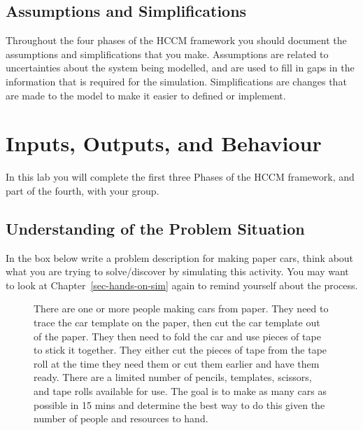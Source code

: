 \documentclass[
  10pt,
  a4paperpaper,
  DIV=11,
  numbers=noendperiod,
  oneside]{scrreprt}
\begin{document}
\section{Assumptions and
Simplifications}\label{assumptions-and-simplifications}

Throughout the four phases of the HCCM framework you should document the
assumptions and simplifications that you make. Assumptions are related
to uncertainties about the system being modelled, and are used to fill
in gaps in the information that is required for the simulation.
Simplifications are changes that are made to the model to make it easier
to defined or implement.

\chapter{Inputs, Outputs, and
Behaviour}\label{inputs-outputs-and-behaviour}

In this lab you will complete the first three Phases of the HCCM
framework, and part of the fourth, with your group.

\section{Understanding of the Problem
Situation}\label{understanding-of-the-problem-situation-1}

In the box below write a problem description for making paper cars,
think about what you are trying to solve/discover by simulating this
activity. You may want to look at Chapter~\ref{sec-hands-on-sim} again
to remind yourself about the process.

\begin{figure}

\begin{mdframed}[innerbottommargin=3cm]

There are one or more people making cars from paper. They need to trace
the car template on the paper, then cut the car template out of the
paper. They then need to fold the car and use pieces of tape to stick it
together. They either cut the pieces of tape from the tape roll at the
time they need them or cut them earlier and have them ready. There are a
limited number of pencils, templates, scissors, and tape rolls available
for use. The goal is to make as many cars as possible in 15 mins and
determine the best way to do this given the number of people and
resources to hand.

\end{mdframed}

\end{figure}%
\end{document}
